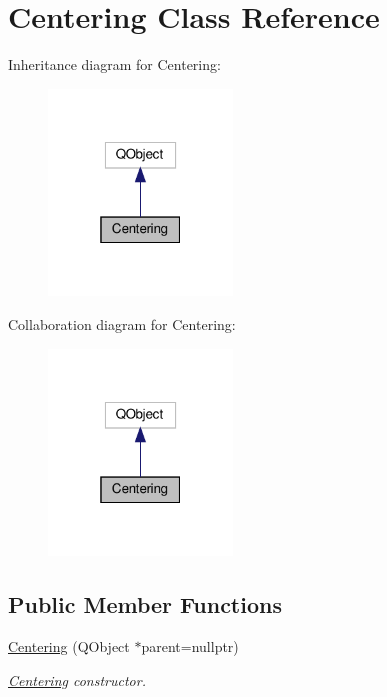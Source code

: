 \hypertarget{classCentering}{}\section{Centering Class Reference}
\label{classCentering}


Inheritance diagram for Centering\+:
\nopagebreak
\begin{figure}[H]
\begin{center}
\leavevmode
\includegraphics[width=139pt]{classCentering__inherit__graph}
\end{center}
\end{figure}


Collaboration diagram for Centering\+:
\nopagebreak
\begin{figure}[H]
\begin{center}
\leavevmode
\includegraphics[width=139pt]{classCentering__coll__graph}
\end{center}
\end{figure}
\subsection*{Public Member Functions}
\begin{DoxyCompactItemize}
\item 
\hyperlink{classCentering_a7b09cff0f47876166f14d3f9ced073e3}{Centering} (Q\+Object $\ast$parent=nullptr)
\begin{DoxyCompactList}\small\item\em \hyperlink{classCentering}{Centering} constructor. \end{DoxyCompactList}\end{DoxyCompactItemize}

